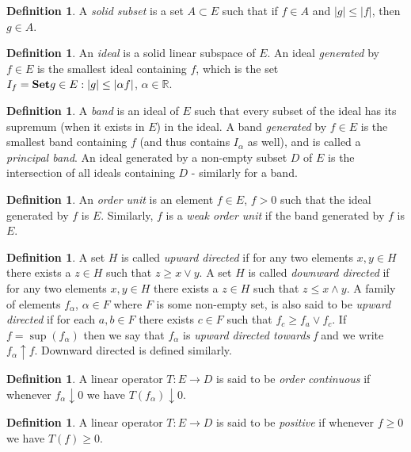 \documentclass[letterpaper,10pt,oneside,onecolumn,reqno]{amsart}
\newcommand{\R}{\mathbb R}
\theoremstyle{definition}
\newtheorem{defn}[thm]{Definition}
\newcommand{\catname}[1]{{\normalfont\textbf{#1}}}
\newcommand{\Set}{\catname{Set}}
\newcommand{\meet}{\wedge}
\newcommand{\join}{\vee}
\begin{document}
\begin{defn}\label{def:9}
 A \emph{solid subset} is a set $A \subset E$ such that if $f \in A$ and $|g| \leq |f|$, then $g \in A$.
\end{defn}

\begin{defn}\label{def:10}
An \emph{ideal} is a solid linear subspace of $E$. An ideal \emph{generated} by $f\in E$ is the smallest ideal containing $f$, which is the set $I_{f} = \Set{g \in E: |g| \leq |\alpha f|}$, $\alpha \in \R$. 
\end{defn}

\begin{defn}\label{def:11}
A \emph{band} is an ideal of $E$ such that every subset of the ideal has its supremum (when it exists in $E$) in the ideal. A band \emph{generated} by $f\in E$ is the smallest band containing $f$ (and thus contains $I_{\alpha}$ as well), and is called a \emph{principal band}. An ideal generated by a non-empty subset $D$ of $E$ is the intersection of all ideals containing $D$ - similarly for a band.
\end{defn}

\begin{defn}\label{def:12}
An \emph{order unit} is an element $f \in E$, $f > 0$ such that the ideal generated by $f$ is $E$. Similarly, $f$ is a \emph{weak order unit} if the band generated by $f$ is $E$.
\end{defn}


\begin{defn}\label{def:13}
A set $H$ is called \emph{upward directed} if for any two elements $x,y \in H$ there exists a $z \in H$ such that $z \geq x \join y$. A set $H$ is called \emph{downward directed} if for any two elements $x,y \in H$ there exists a $z \in H$ such that $z \leq x \meet y$. A family of elements $f_{\alpha}$, $\alpha \in F$ where $F$ is some non-empty set, is also said to be \emph{upward directed} if for each $a,b \in F$ there exists $c \in F$ such that $f_c \geq f_a \join f_c$. If $f = \sup({f_\alpha})$ then we say that $f_{\alpha}$ is \emph{upward directed towards f} and we write $f_{\alpha}\uparrow f$. Downward directed is defined similarly. 
\end{defn}

\begin{defn}\label{def:14}
A linear operator $T : E \to D$ is said to be \emph{order continuous} if whenever $f_{\alpha} \downarrow 0$ we have $T(f_{\alpha}) \downarrow 0$.
\end{defn}
\begin{defn}\label{def:15}
A linear operator $T : E \to D$ is said to be \emph{positive} if whenever $f \geq 0$ we have $T(f) \geq 0$.
\end{defn}
\end{document}
